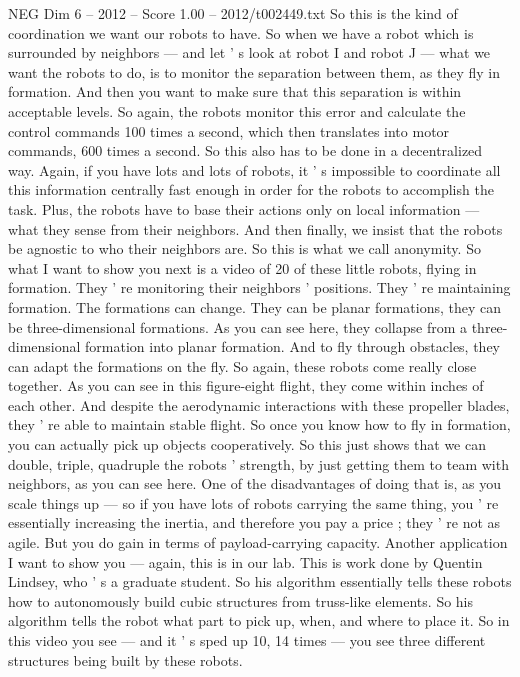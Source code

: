 \begin{textsample}{NEG Dim 6 – 2012 – Score 1.00 – 2012/t002449.txt}
So this is the kind of coordination we want our robots to have.
So when we have a robot which is surrounded by neighbors — and let ' s look at robot I and robot J — what we want the robots to do, is to monitor the separation between them, as they fly in formation.
And then you want to make sure that this separation is within acceptable levels.
So again, the robots monitor this error and calculate the control commands 100 times a second, which then translates into motor commands, 600 times a second.
So this also has to be done in a decentralized way.
Again, if you have lots and lots of robots, it ' s impossible to coordinate all this information centrally fast enough in order for the robots to accomplish the task.
Plus, the robots have to base their actions only on local information — what they sense from their neighbors.
And then finally, we insist that the robots be agnostic to who their neighbors are.
So this is what we call anonymity.
So what I want to show you next is a video of 20 of these little robots, flying in formation.
They ' re monitoring their neighbors ' positions.
They ' re maintaining formation.
The formations can change.
They can be planar formations, they can be three-dimensional formations.
As you can see here, they collapse from a three-dimensional formation into planar formation.
And to fly through obstacles, they can adapt the formations on the fly.
So again, these robots come really close together.
As you can see in this figure-eight flight, they come within inches of each other.
And despite the aerodynamic interactions with these propeller blades, they ' re able to maintain stable flight.
So once you know how to fly in formation, you can actually pick up objects cooperatively.
So this just shows that we can double, triple, quadruple the robots ' strength, by just getting them to team with neighbors, as you can see here.
One of the disadvantages of doing that is, as you scale things up — so if you have lots of robots carrying the same thing, you ' re essentially increasing the inertia, and therefore you pay a price ; they ' re not as agile.
But you do gain in terms of payload-carrying capacity.
Another application I want to show you — again, this is in our lab.
This is work done by Quentin Lindsey, who ' s a graduate student.
So his algorithm essentially tells these robots how to autonomously build cubic structures from truss-like elements.
So his algorithm tells the robot what part to pick up, when, and where to place it.
So in this video you see — and it ' s sped up 10, 14 times — you see three different structures being built by these robots.

\end{textsample}
